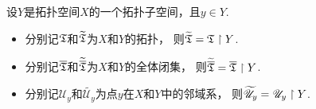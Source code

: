 \begin{theorem}
设\(Y\)是拓扑空间\(X\)的一个拓扑子空间，且\(y \in Y\).
\def\Uy{\mathscr{U}_y}
\def\wUy{\widetilde{\Uy}}
\begin{itemize}
	\item 分别记\({\mathfrak T}\)和\(\widetilde{{\mathfrak T}}\)为\(X\)和\(Y\)的拓扑，
	则\(\widetilde{{\mathfrak T}} = {\mathfrak T} \upharpoonright Y\).
	\item 分别记\(\overline{{\mathfrak T}}\)和\(\widetilde{\overline{{\mathfrak T}}}\)为\(X\)和\(Y\)的全体闭集，
	则\(\widetilde{\overline{{\mathfrak T}}} = \overline{{\mathfrak T}} \upharpoonright Y\).
	\item 分别记\(\Uy\)和\(\wUy\)为点\(y\)在\(X\)和\(Y\)中的邻域系，
	则\(\wUy = \Uy \SetRestrict Y\).
\end{itemize}
\end{theorem}
